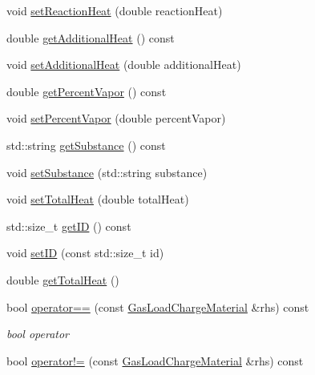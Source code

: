\begin{DoxyCompactItemize}
void \hyperlink{class_gas_load_charge_material_a721f02cbd0bfbb6ebe67c0da09f0b0f2}{set\+Reaction\+Heat} (double reaction\+Heat)
\item 
double \hyperlink{class_gas_load_charge_material_a5c01f171b61c01c93db6453cb122e1ba}{get\+Additional\+Heat} () const
\item 
void \hyperlink{class_gas_load_charge_material_a08ef5196ea9919dfc71be6744c7da08e}{set\+Additional\+Heat} (double additional\+Heat)
\item 
double \hyperlink{class_gas_load_charge_material_a19b8ecfad235b5824b0a88903cff667a}{get\+Percent\+Vapor} () const
\item 
void \hyperlink{class_gas_load_charge_material_acace81e16ef531acb0a68462ab0ed25d}{set\+Percent\+Vapor} (double percent\+Vapor)
\item 
std\+::string \hyperlink{class_gas_load_charge_material_a5f967841f196f6b0b35f32f9610092e3}{get\+Substance} () const
\item 
void \hyperlink{class_gas_load_charge_material_a20cc3df601d8daae9b8f8e7b0c53c2e3}{set\+Substance} (std\+::string substance)
\item 
void \hyperlink{class_gas_load_charge_material_aae01f6f4f923965c111e1dac66eb8365}{set\+Total\+Heat} (double total\+Heat)
\item 
std\+::size\+\_\+t \hyperlink{class_gas_load_charge_material_a32dc0d73857ebe4322cf525064713cf6}{get\+ID} () const
\item 
void \hyperlink{class_gas_load_charge_material_a24b43ba7c871453258f458a8c1f15232}{set\+ID} (const std\+::size\+\_\+t id)
\item 
double \hyperlink{class_gas_load_charge_material_a4f831537652ca09c4539982c626cc164}{get\+Total\+Heat} ()
\item 
\mbox{\label{class_gas_load_charge_material_ac1d95bdf7d61d8ed98629aa17bf2c4b1}} 
bool \hyperlink{class_gas_load_charge_material_ac1d95bdf7d61d8ed98629aa17bf2c4b1}{operator==} (const \hyperlink{class_gas_load_charge_material}{Gas\+Load\+Charge\+Material} \&rhs) const
\begin{DoxyCompactList}\small\item\em bool operator \end{DoxyCompactList}\item 
\mbox{\label{class_gas_load_charge_material_ac6bc3f665a91fde01ebf6d1528cb7332}} 
bool \hyperlink{class_gas_load_charge_material_ac6bc3f665a91fde01ebf6d1528cb7332}{operator!=} (const \hyperlink{class_gas_load_charge_material}{Gas\+Load\+Charge\+Material} \&rhs) const

\end{DoxyCompactItemize}
